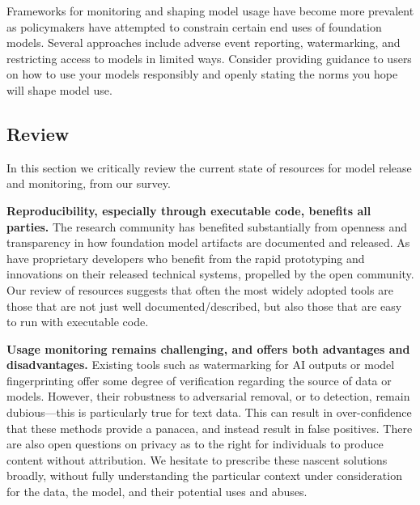Frameworks for monitoring and shaping model usage have become more prevalent as policymakers have attempted to constrain certain end uses of foundation models. Several approaches include adverse event reporting, watermarking, and restricting access to models in limited ways. Consider providing guidance to users on how to use your models responsibly and openly stating the norms you hope will shape model use.

\subsection{Review}

In this section we critically review the current state of resources for model release and monitoring, from our survey. 


\textbf{Reproducibility, especially through executable code, benefits all parties.} The research community has benefited substantially from openness and transparency in how foundation model artifacts are documented and released. 
As have proprietary developers who benefit from the rapid prototyping and innovations on their released technical systems, propelled by the open community.
Our review of resources suggests that often the most widely adopted tools are those that are not just well documented/described, but also those that are easy to run with executable code.

\textbf{Usage monitoring remains challenging, and offers both advantages and disadvantages.}
Existing tools such as watermarking for AI outputs \citep{kirchenbauer2023watermark,saberi2023robustness} or model fingerprinting \citep{xu2024instructional} offer some degree of verification regarding the source of data or models.
However, their robustness to adversarial removal, or to detection, remain dubious---this is particularly true for text data.
This can result in over-confidence that these methods provide a panacea, and instead result in false positives.
There are also open questions on privacy as to the right for individuals to produce content without attribution.
We hesitate to prescribe these nascent solutions broadly, without fully understanding the particular context under consideration for the data, the model, and their potential uses and abuses.

